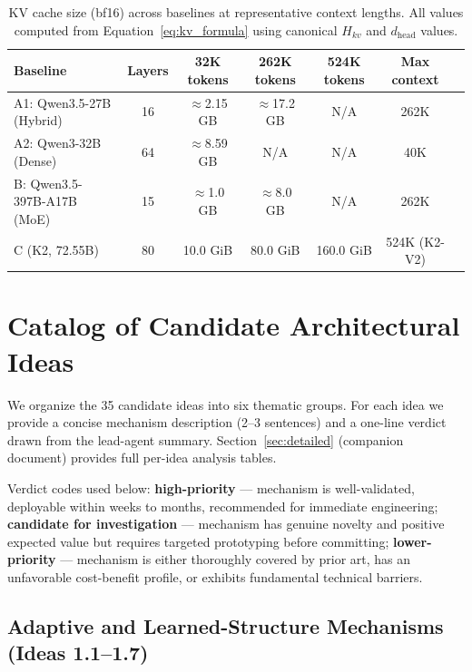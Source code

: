 \documentclass[11pt]{article}
\begin{document}
\begin{table}[ht]
\centering
\caption{KV cache size (bf16) across baselines at representative context lengths.
All values computed from Equation~\ref{eq:kv_formula} using canonical $H_{kv}$ and $d_{\text{head}}$ values.}
\label{tab:kv_comparison}
\begin{tabular}{lcccccc}
\toprule
\textbf{Baseline} & \textbf{Layers} & \textbf{32K tokens} & \textbf{262K tokens} & \textbf{524K tokens} & \textbf{Max context} \\
\midrule
A1: Qwen3.5-27B (Hybrid) & 16 & $\approx$2.15 GB & $\approx$17.2 GB & N/A & 262K \\
A2: Qwen3-32B (Dense) & 64 & $\approx$8.59 GB & N/A & N/A & 40K \\
B: Qwen3.5-397B-A17B (MoE) & 15 & $\approx$1.0 GB & $\approx$8.0 GB & N/A & 262K \\
C (K2, 72.55B) & 80 & 10.0 GiB & 80.0 GiB & 160.0 GiB & 524K (K2-V2) \\
\bottomrule
\end{tabular}
\end{table}

\section{Catalog of Candidate Architectural Ideas}
\label{sec:catalog}

We organize the 35 candidate ideas into six thematic groups.
For each idea we provide a concise mechanism description (2--3 sentences) and a one-line verdict drawn from the lead-agent summary.
Section~\ref{sec:detailed} (companion document) provides full per-idea analysis tables.

Verdict codes used below: \textbf{high-priority} --- mechanism is well-validated, deployable within weeks to months, recommended for immediate engineering; \textbf{candidate for investigation} --- mechanism has genuine novelty and positive expected value but requires targeted prototyping before committing; \textbf{lower-priority} --- mechanism is either thoroughly covered by prior art, has an unfavorable cost-benefit profile, or exhibits fundamental technical barriers.

\subsection{Adaptive and Learned-Structure Mechanisms (Ideas 1.1--1.7)}
\label{sec:group1}
\end{document}
